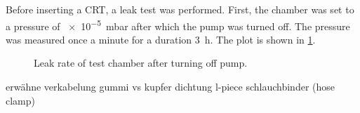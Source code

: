 Before inserting a CRT, a leak test was performed. First, the chamber was set to a pressure of \SI{e-5}{\milli\bar} after which the pump was turned off. The pressure was measured once a minute for a duration \SI{3}{\hour}. The plot is shown in \cref{fig:Leak rate of test chamber after turning off pump}.

\begin{figure}[ht]
	\centering
		
	\begin{tikzpicture}
		
	\end{tikzpicture}
	
	\caption{Leak rate of test chamber after turning off pump.}
	\label{fig:Leak rate of test chamber after turning off pump}
\end{figure}


erwähne verkabelung
gummi vs kupfer dichtung
l-piece
schlauchbinder (hose clamp)